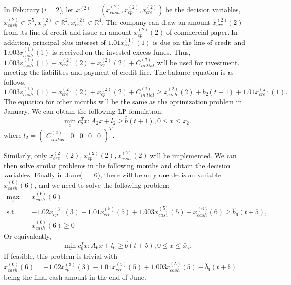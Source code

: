 \documentclass[13pt]{article}
\begin{document}
    In Feburary ($i = 2$), let $x^{(2)}=(x^{(2)}_{cash}, x^{(2)}_{cp}, x^{(2)}_{cre})$ be the decision variables, $x^{(2)}_{cash}\in\mathbb{R}^5, x^{(2)}_{cp}\in\mathbb{R}^2, x^{(2)}_{cre}\in\mathbb{R}^4$. The company can draw an amount $x^{(2)}_{cre}(2)$ from its line of credit and issue an amount $x^{(2)}_{cp}(2)$ of commercial paper. In addition, principal plus interest of $1.01x^{(1)}_{cre}(1)$ is due on the line of credit and $1.003x^{(1)}_{cash}(1)$ is received on the invested excess funds. Thus, $1.003x^{(1)}_{cash}(1)+x^{(2)}_{cre}(2)+x^{(2)}_{cp}(2)+C^{(2)}_{initial}$ will be used for investment, meeting the liabilities and payment of credit line. The balance equation is as follows, 
        \[
            1.003x^{(1)}_{cash}(1)+x^{(2)}_{cre}(2)+x^{(2)}_{cp}(2)+C^{(2)}_{initial}\geq x^{(2)}_{cash}(2) + \hat{b}_2(t+1)+1.01x^{(2)}_{cre}(1).
        \]
    The equation for other months will be the same as the optimization problem in January. We can obtain the following LP fomulation:
    \begin{equation}\label{eq:naiveFeb}
        \min_x c_2^Tx: A_2x+l_2\geq\hat{b}(t+1), 0\leq x\leq \bar{x}_2.
    \end{equation}
    where $l_2 = \begin{pmatrix}C^{(2)}_{initial} & 0& 0& 0& 0\end{pmatrix}^T$.

    Similarly, only $x^{(2)}_{cre}(2)$, $x^{(2)}_{cp}(2), x^{(2)}_{cash}(2)$ will be implemented. We can then solve similar problems in the following months and obtain the decision variables. Finally in June(i = 6), there will be only one decision variable $x^{(6)}_{cash}(6)$, and we need to solve the following problem:
    \[
        \begin{split}
            \max_{x} \quad & x^{(6)}_{cash}(6) \\
            \text{s.t.} \quad 
            & - 1.02x^{(3)}_{cp}(3) - 1.01x^{(5)}_{cre}(5) + 1.003x^{(5)}_{cash}(5) - x^{(6)}_{cash}(6) \geq \hat{b}_6(t+5),  \\
            & x^{(6)}_{cash}(6)\geq 0
        \end{split}
    \]
    Or equivalently,
    \begin{equation}\label{eq:naiveJune}
        \min_x c_6^Tx: A_6x+l_6\geq\hat{b}(t+5), 0\leq x\leq \bar{x}_5.
    \end{equation}
    If feasible, this problem is trivial with $x^{(6)}_{cash}(6) = - 1.02x^{(3)}_{cp}(3) - 1.01x^{(5)}_{cre}(5) + 1.003x^{(5)}_{cash}(5) - \hat{b}_6(t+5)$ being the final cash amount in the end of June.
\end{document}
